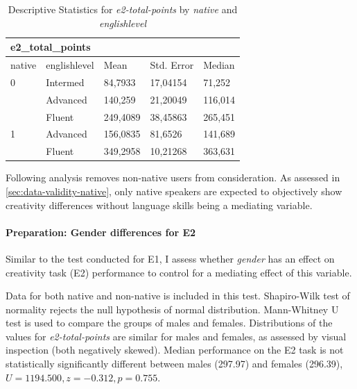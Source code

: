 	\begin{table}[]
		\centering
		\begin{tabular}{ll|lll}
			\multicolumn{5}{l}{e2\_total\_points}                   \\ \hline
			native & englishlevel & Mean     & Std. Error & Median  \\ \hline
			0      & Intermed     & 84,7933  & 17,04154   & 71,252  \\
			& Advanced     & 140,259  & 21,20049   & 116,014 \\
			& Fluent       & 249,4089 & 38,45863   & 265,451 \\ \hline
			1      & Advanced     & 156,0835 & 81,6526    & 141,689 \\
			& Fluent       & 349,2958 & 10,21268   & 363,631 \\ \hline \hline
		\end{tabular}
		\caption{Descriptive Statistics for \textit{e2-total-points} by \textit{native} and \textit{englishlevel}}
		\label{tbl:stat-e2-total-points-by-lang}
	\end{table}

	Following analysis removes non-native users from consideration. As assessed in \ref{sec:data-validity-native}, only native speakers are expected to objectively show creativity differences without language skills being a mediating variable.

	
	\paragraph{Preparation: Gender differences for E2}
	
	Similar to the test conducted for E1, I assess whether \textit{gender} has an effect on creativity task (E2) performance to control for a mediating effect of this variable.
	
	Data for both native and non-native is included in this test.
	Shapiro-Wilk test of normality rejects the null hypothesis of normal distribution. 
	Mann-Whitney U test is used to compare the groups of males and females. 
	Distributions of the values for \textit{e2-total-points} are similar for males and females, as assessed by visual inspection (both negatively skewed). 
	Median performance on the E2 task is not statistically significantly different between males (297.97) and females (296.39), $ U = 1194.500, z = -0.312, p = 0.755 $. 
	
